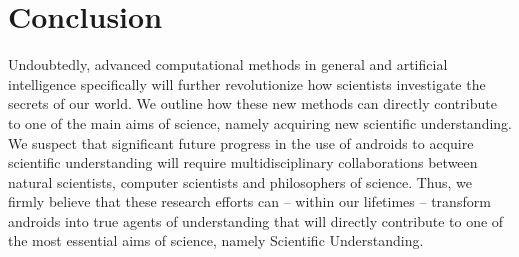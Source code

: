 \section{Conclusion}
Undoubtedly, advanced computational methods in general and artificial intelligence specifically will further revolutionize how scientists investigate the secrets of our world. We outline how these new methods can directly contribute to one of the main aims of science, namely acquiring new scientific understanding. We suspect that significant future progress in the use of androids to acquire scientific understanding will require multidisciplinary collaborations between natural scientists, computer scientists and philosophers of science. Thus, we firmly believe that these research efforts can -- within our lifetimes -- transform androids into true agents of understanding that will directly contribute to one of the most essential aims of science, namely Scientific Understanding.
